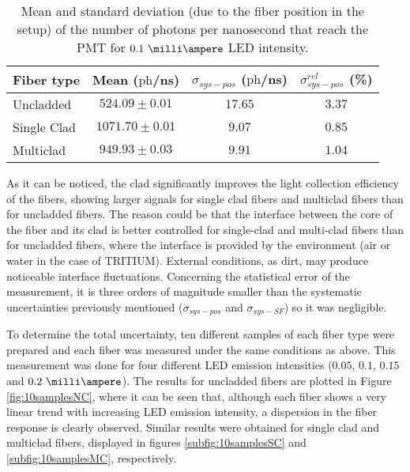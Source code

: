\begin{table}[htbp]
\centering{}%
\begin{tabular}{lccc}
\toprule 
Fiber type & Mean ($\text{ph}$/ns) & $\sigma_{sys-pos}$ ($\text{ph}$/ns) & $\sigma^{rel}_{sys-pos}$ (\%) \tabularnewline
\midrule
\midrule 
Uncladded & $524.09 \pm 0.01$ & $17.65$ & $3.37$ \tabularnewline
Single Clad & $1071.70 \pm 0.01$ & $9.07$ & $0.85$ \tabularnewline
Multiclad & $949.93 \pm 0.03$ & $9.91$ & $1.04$ \tabularnewline
\bottomrule
\end{tabular}
\caption{Mean and standard deviation (due to the fiber position in the setup) of the number of photons per nanosecond that reach the PMT for $0.1~\milli\ampere$ LED intensity.}
\label{tab:PositionStandardDeviation}
\end{table}
As it can be noticed, the clad significantly improves the light collection efficiency of the fibers, showing larger signals for single clad fibers and multiclad fibers than for uncladded fibers. The reason could be that the interface between the core of the fiber and its clad is better controlled for single-clad and multi-clad fibers than for uncladded fibers, where the interface is provided by the environment (air or water in the case of TRITIUM). External conditions, as dirt, may produce noticeable interface fluctuations. Concerning the statistical error of the measurement, it is three orders of magnitude smaller than the systematic uncertainties previously mentioned ($\sigma_{sys-pos}$ and $\sigma_{sys-SF}$) so it was negligible.



To determine the total uncertainty, ten different samples of each fiber type were prepared and each fiber was measured under the same conditions as above. This measurement was done for four different LED emission intensities ($0.05$, $0.1$, $0.15$ and $0.2~\milli\ampere$). The results for uncladded fibers are plotted in Figure \ref{fig:10samplesNC}, where it can be seen that, although each fiber shows a very linear trend with increasing LED emission intensity, a dispersion in the fiber response is clearly observed. Similar results were obtained for single clad and multiclad fibers, displayed in figures \ref{subfig:10samplesSC} and \ref{subfig:10samplesMC}, respectively.

